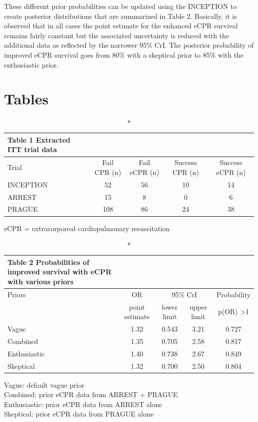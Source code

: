\documentclass[
  super,
  preprint,
  3p]{elsarticle}
\begin{document}
These different prior probabilities can be updated using the INCEPTION
to create posterior distributions that are summarized in Table 2.
Basically, it is observed that in all cases the point estimate for the
enhanced eCPR survival remains fairly constant but the associated
uncertainty is reduced with the additional data as reflected by the
narrower 95\% CrI. The posterior probability of improved eCPR survival
goes from 80\% with a skeptical prior to 85\% with the enthusiastic
prior.

\newpage

\hypertarget{tables}{%
\section{Tables}\label{tables}}

\setlength{\LTpost}{0mm}
\begin{longtable}{lcccc}
\caption*{
{\large Table 1 Extracted ITT trial data}
} \\ 
\toprule
Trial & Fail CPR (n) & Fail eCPR (n) & Success CPR (n) & Success eCPR (n) \\ 
\midrule
INCEPTION & 52 & 56 & 10 & 14 \\ 
ARREST & 15 & 8 & 0 & 6 \\ 
PRAGUE & 108 & 86 & 24 & 38 \\ 
\bottomrule
\end{longtable}
\begin{minipage}{\linewidth}
eCPR = extracorporeal cardiopulmonary resuscitation\\
\end{minipage}

\setlength{\LTpost}{0mm}
\begin{longtable}{lcccc}
\caption*{
{\large Table 2 Probabilities of improved survival with eCPR with various priors}
} \\ 
\toprule
Priors & OR & \multicolumn{2}{c}{95\% CrI} & Probability \\ 
\cmidrule(lr){1-1} \cmidrule(lr){2-2} \cmidrule(lr){3-4} \cmidrule(lr){5-5}
 & point estimate & lower limit & upper limit & p(OR) >1  \\ 
\midrule
Vague & 1.32 & 0.543 & 3.21 & 0.727 \\ 
Combined & 1.35 & 0.705 & 2.58 & 0.817 \\ 
Enthusiastic & 1.40 & 0.738 & 2.67 & 0.849 \\ 
Skeptical & 1.32 & 0.700 & 2.50 & 0.804 \\ 
\bottomrule
\end{longtable}
\begin{minipage}{\linewidth}
Vague: default vague prior\\
Combined: prior eCPR data from ARREST + PRAGUE\\
Enthusiastic: prior eCPR data from ARREST alone\\
Skeptical: prior eCPR data from PRAGUE alone\\
\end{minipage}
\end{document}
